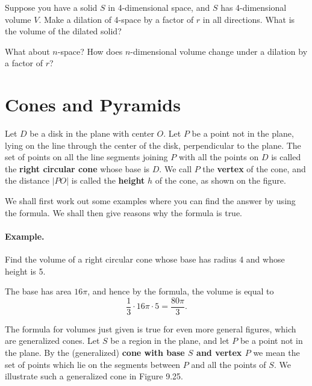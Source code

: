 \documentclass[12pt]{book} %
\begin{document}
\setcounter{Exercise}{0}
\begin{ExerciseList}
\Exercise Suppose you have a solid $S$ in 4-dimensional space, and $S$ has 4-dimensional volume $V$. Make a dilation of 4-space by a factor of $r$ in all directions. What is the volume of the dilated solid?

\Exercise What about $n$-space? How does $n$-dimensional volume change under a dilation by a factor of $r$?
\end{ExerciseList}

\section{Cones and Pyramids}

Let $D$ be a disk in the plane with center $O$. Let $P$ be a point not in the plane, lying on the line through the center of the disk, perpendicular to the plane. The set of points on all the line segments joining $P$ with all the points on $D$ is called the \textbf{right circular cone} whose base is $D$. We call $P$ the \textbf{vertex} of the cone, and the distance $|PO|$ is called the \textbf{height} $h$ of the cone, as shown on the figure.



We shall first work out some examples where you can find the answer by using the formula. We shall then give reasons why the formula is true.

\paragraph{Example.}
Find the volume of a right circular cone whose base has radius 4 and whose height is 5.

The base has area $16\pi$, and hence by the formula, the volume is equal to
\[
\frac13\cdot 16\pi \cdot 5=\frac{80\pi}{3}.
\]

The formula for volumes just given is true for even more general figures, which are generalized cones. Let $S$ be a region in the plane, and let $P$ be a point not in the plane. By the (generalized) \textbf{cone with base $S$ and vertex $P$} we mean the set of points which lie on the segments between $P$ and all the points of $S$. We illustrate such a generalized cone in Figure 9.25.
\end{document}
